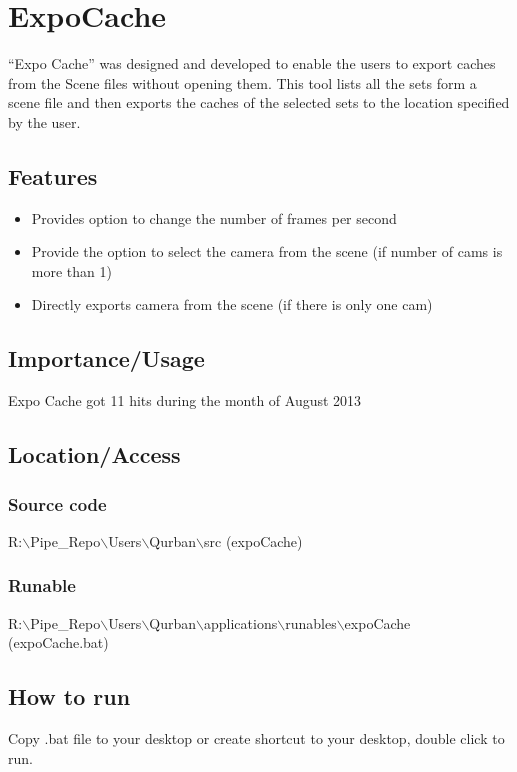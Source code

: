 \section{ExpoCache}

“Expo Cache” was designed and developed to enable the users to export caches
from the Scene files without opening them. This tool lists all the sets form a
scene file and then exports the caches of the selected sets to the location
specified by the user.

\subsection*{Features}

\begin{itemize}
\item Provides option to change the number of frames per second
\item Provide the option to select the camera from the scene (if number of cams is more than 1)
\item Directly exports camera from the scene (if there is only one cam)
\end{itemize}

\subsection*{Importance/Usage}

Expo Cache got 11 hits during the month of August 2013

\subsection*{Location/Access}

\subsubsection*{Source code}
R:$\backslash$Pipe\_Repo$\backslash$Users$\backslash$Qurban$\backslash$src (expoCache)

\subsubsection*{Runable}
R:$\backslash$Pipe\_Repo$\backslash$Users$\backslash$Qurban$\backslash$applications$\backslash$runables$\backslash$expoCache (expoCache.bat)

\subsection*{How to run} 
Copy .bat file to your desktop or create shortcut to your desktop, double
click to run.



